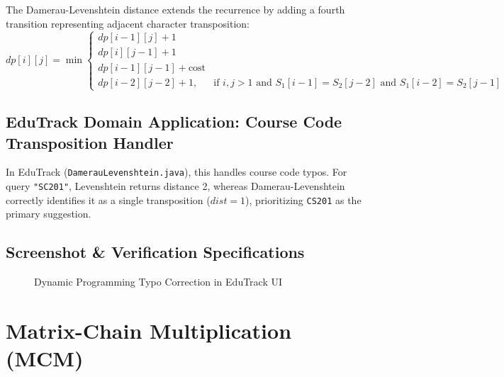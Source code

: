 The Damerau-Levenshtein distance extends the recurrence by adding a fourth transition representing adjacent character transposition:
\begin{equation}
dp[i][j] = \min \begin{cases}
dp[i-1][j] + 1 \\
dp[i][j-1] + 1 \\
dp[i-1][j-1] + \text{cost} \\
dp[i-2][j-2] + 1, & \text{if } i, j > 1 \text{ and } S_1[i-1] = S_2[j-2] \text{ and } S_1[i-2] = S_2[j-1]
\end{cases}
\end{equation}

\subsection{EduTrack Domain Application: Course Code Transposition Handler}
In EduTrack (\texttt{DamerauLevenshtein.java}), this handles course code typos. For query \texttt{"SC201"}, Levenshtein returns distance 2, whereas Damerau-Levenshtein correctly identifies it as a single transposition ($dist = 1$), prioritizing \texttt{CS201} as the primary suggestion.

\subsection{Screenshot \& Verification Specifications}
\begin{figure}[H]
    \centering
    \caption{Dynamic Programming Typo Correction in EduTrack UI}
    \label{fig:screenshot_dp_typo}
\end{figure}

\section{Matrix-Chain Multiplication (MCM)}
